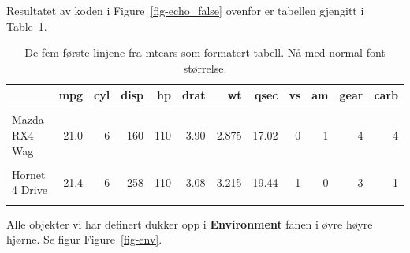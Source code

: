\documentclass[
  letterpaper,
  DIV=11,
  numbers=noendperiod]{scrartcl}
\begin{document}
Resultatet av koden i Figure~\ref{fig-echo_false} ovenfor er tabellen
gjengitt i Table~\ref{tbl-fem_første_mtcars_2}.

\hypertarget{tbl-fem_fuxf8rste_mtcars_2}{}
\begin{table}[H]
\caption{\label{tbl-fem_første_mtcars_2}De fem første linjene fra mtcars som formatert tabell. Nå med normal
font størrelse. }\tabularnewline

\centering
\begin{tabular}[t]{lrrrrrrrrrrr}
\toprule
  & mpg & cyl & disp & hp & drat & wt & qsec & vs & am & gear & carb\\
\midrule
\cellcolor{gray!6}{Mazda RX4} & \cellcolor{gray!6}{21.0} & \cellcolor{gray!6}{6} & \cellcolor{gray!6}{160} & \cellcolor{gray!6}{110} & \cellcolor{gray!6}{3.90} & \cellcolor{gray!6}{2.620} & \cellcolor{gray!6}{16.46} & \cellcolor{gray!6}{0} & \cellcolor{gray!6}{1} & \cellcolor{gray!6}{4} & \cellcolor{gray!6}{4}\\
Mazda RX4 Wag & 21.0 & 6 & 160 & 110 & 3.90 & 2.875 & 17.02 & 0 & 1 & 4 & 4\\
\cellcolor{gray!6}{Datsun 710} & \cellcolor{gray!6}{22.8} & \cellcolor{gray!6}{4} & \cellcolor{gray!6}{108} & \cellcolor{gray!6}{93} & \cellcolor{gray!6}{3.85} & \cellcolor{gray!6}{2.320} & \cellcolor{gray!6}{18.61} & \cellcolor{gray!6}{1} & \cellcolor{gray!6}{1} & \cellcolor{gray!6}{4} & \cellcolor{gray!6}{1}\\
Hornet 4 Drive & 21.4 & 6 & 258 & 110 & 3.08 & 3.215 & 19.44 & 1 & 0 & 3 & 1\\
\cellcolor{gray!6}{Hornet Sportabout} & \cellcolor{gray!6}{18.7} & \cellcolor{gray!6}{8} & \cellcolor{gray!6}{360} & \cellcolor{gray!6}{175} & \cellcolor{gray!6}{3.15} & \cellcolor{gray!6}{3.440} & \cellcolor{gray!6}{17.02} & \cellcolor{gray!6}{0} & \cellcolor{gray!6}{0} & \cellcolor{gray!6}{3} & \cellcolor{gray!6}{2}\\
\bottomrule
\end{tabular}
\end{table}

Alle objekter vi har definert dukker opp i \textbf{Environment} fanen i
øvre høyre hjørne. Se figur Figure~\ref{fig-env}.
\end{document}
